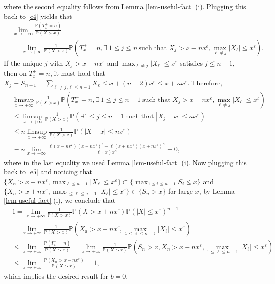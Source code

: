 \documentclass[11pt]{article}
\numberwithin{equation}{section}
\begin{document}
where the second equality follows from  Lemma \ref{lem-useful-fact} (i). Plugging this back to \eqref{e4} yields that 
\begin{align}\label{e5}
	& \lim_{x\to +\infty} \frac{\mathbb{P}(T_x^+ =n)}{\mathbb{P}(X>x)} \nonumber\\
	&  = \lim_{x\to +\infty} \frac{1}{\mathbb{P}(X>x)} \mathbb{P}\left(T_x^+=n, \exists \ 1\leq j\leq n\ \mbox{such that } X_j>x- nx^\varepsilon, \max_{\ell\neq j} |X_\ell | \leq x^\varepsilon \right). 
\end{align}
If the unique $j$ with $X_j>x-nx^\varepsilon$ and $\max_{\ell\neq j} |X_\ell|\leq x^\varepsilon$ satisfies $j\leq n-1$, then on $T_x^+=n$, it must hold that $X_j = S_{n-1}- \sum_{\ell\neq j ,\ell\leq n-1} X_\ell \leq x+ (n-2)x^\varepsilon\leq x+nx^\varepsilon $.  Therefore, 
\begin{align}\label{e5'}
	& \limsup_{x\to +\infty} \frac{1}{\mathbb{P}(X>x)}\mathbb{P}\left(T_x^+=n, \exists \ 1\leq j\leq n-1\ \mbox{such that } X_j>x- nx^\varepsilon, \max_{\ell\neq j} |X_\ell | \leq x^\varepsilon \right) \nonumber\\
	& \leq \limsup_{x\to +\infty} \frac{1}{\mathbb{P}(X>x)} \mathbb{P}\left( \exists 1\leq j\leq n-1\ \mbox{such that }  |X_j-x|\leq nx^\varepsilon\right) \nonumber\\
	&\leq n  \limsup_{x\to +\infty} \frac{1}{\mathbb{P}(X>x)}\mathbb{P}\left(   |X-x|\leq nx^\varepsilon\right) \nonumber\\
	&= n  \lim_{x\to +\infty} \frac{\ell(x-nx^\varepsilon)(x-nx^\varepsilon)^a-\ell(x+nx^\varepsilon)(x+nx^\varepsilon)^a}{\ell(x)x^a}=0,
\end{align}
where in the last equality we used  Lemma \ref{lem-useful-fact} (i). Now plugging this back to \eqref{e5} and noticing that 
$\{X_n>x- nx^\varepsilon, \max_{\ell \leq n-1} |X_\ell | \leq x^\varepsilon \}\subset  \{ \max_{1\leq i\leq n-1} S_i\leq x\}$ and $\{X_n>x+ nx^\varepsilon, \max_{1\leq \ell \leq n-1} |X_\ell | \leq x^\varepsilon \}\subset  \{ S_n > x\}$  for large $x$, by Lemma \ref{lem-useful-fact} (i), we conclude that 
\begin{align}
	&1= \lim_{x\to +\infty} \frac{1}{\mathbb{P}(X>x)} \mathbb{P}\left(X>x+ nx^\varepsilon\right) \mathbb{P}\left( |X| \leq x^\varepsilon \right)^{n-1}  \nonumber\\
	&= \lim_{x\to +\infty} \frac{1}{\mathbb{P}(X>x)} \mathbb{P}\left(X_n>x+ nx^\varepsilon, \max_{1\leq \ell \leq n-1} |X_\ell | \leq x^\varepsilon \right) \nonumber\\
	&\leq  \lim_{x\to +\infty} \frac{\mathbb{P}(T_x^+ =n)}{\mathbb{P}(X>x)}   = \lim_{x\to +\infty} \frac{1}{\mathbb{P}(X>x)}\mathbb{P}\left(S_n >x, X_n>x- nx^\varepsilon, \max_{1\leq \ell \leq n-1} |X_\ell | \leq x^\varepsilon \right) \nonumber\\
	& \leq  \lim_{x\to +\infty} \frac{\mathbb{P}\left( X_n>x- nx^\varepsilon \right)}{\mathbb{P}(X>x)} =1,
\end{align}
which implies the desired result for $b=0$.
\end{document}
